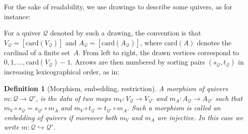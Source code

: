 \documentclass[10pt,a4paper]{article}
\newtheorem{definition}[theorem]{Definition}
\renewcommand{\~}{\widetilde}
\newcommand{\Q}{\mathcal Q}
\newcommand{\card}[1]{\mathrm{card}(#1)}
\begin{document}
For the sake of readability, we use drawings to describe some quivers, as for instance:
\begin{figure}[h]
\begin{center}
\end{center}
\end{figure}

For a quiver $\Q$ denoted by such a drawing, the convention is that $V_\Q = [\card{V_\Q}]$ and $A_\Q = [\card{A_\Q}]$, where $\card A$ denotes the cardinal of a finite set~$A$. From left to right, the drawn vertices correspond to $0, 1, \dots, \card{V_\Q}-1$. Arrows are then numbered by sorting pairs $(s_\Q, t_\Q)$ in increasing lexicographical order, as in:
\begin{figure}[h]
\begin{center}
\end{center}
\end{figure}

\begin{definition}[Morphism, embedding, restriction]
  A \emph{morphism of quivers} $m\colon \Q \to \Q'$, is the data of two maps $m_V\colon V_\Q \to V_{\Q'}$ and $m_A\colon A_\Q \to A_{\Q'}$ such that $m_V \circ s_\Q = s_{\Q'} \circ m_A$ and $m_V \circ t_\Q = t_{\Q'} \circ m_A$. Such a morphism is called an \emph{embedding of quivers} if moreover both $m_V$ and $m_A$ are injective. In this case we write $m\colon \Q \hookrightarrow \Q'$.
\end{definition}
\end{document}
